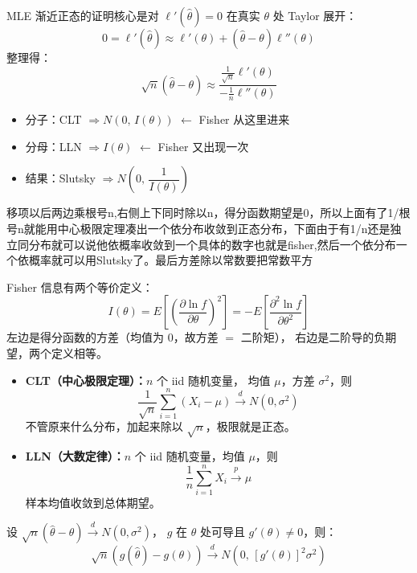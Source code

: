\begin{note}
    MLE 渐近正态的证明核心是对 $\ell'(\hat{\theta})=0$ 在真实 $\theta$ 处 Taylor 展开：
$$0 = \ell'(\hat{\theta}) \approx \ell'(\theta) + (\hat{\theta} - \theta)\ell''(\theta)$$
整理得：
$$\sqrt{n}(\hat{\theta} - \theta) \approx \frac{\frac{1}{\sqrt{n}}\ell'(\theta)}{-\frac{1}{n}\ell''(\theta)}$$

\begin{itemize}
  \item 分子：CLT $\Rightarrow N(0,\, I(\theta))$ \quad $\leftarrow$ Fisher 从这里进来
  \item 分母：LLN $\Rightarrow I(\theta)$ \quad $\leftarrow$ Fisher 又出现一次
  \item 结果：Slutsky $\Rightarrow N\!\left(0,\, \dfrac{1}{I(\theta)}\right)$
\end{itemize}


\end{note}
\begin{dxtips}
    移项以后两边乘根号n,右侧上下同时除以n，得分函数期望是0，所以上面有了1/根号n就能用中心极限定理凑出一个依分布收敛到正态分布，下面由于有1/n还是独立同分布就可以说他依概率收敛到一个具体的数字也就是fisher,然后一个依分布一个依概率就可以用Slutsky了。最后方差除以常数要把常数平方
    
\end{dxtips}
\begin{dxtips}
    Fisher 信息有两个等价定义：
$$I(\theta) = E\!\left[\left(\frac{\partial \ln f}{\partial\theta}\right)^2\right] = -E\!\left[\frac{\partial^2 \ln f}{\partial\theta^2}\right]$$
左边是得分函数的方差（均值为 $0$，故方差 $=$ 二阶矩），
右边是二阶导的负期望，两个定义相等。
\end{dxtips}
\begin{note}
    \begin{itemize}
  \item \textbf{CLT（中心极限定理）：}$n$ 个 iid 随机变量，
        均值 $\mu$，方差 $\sigma^2$，则
        $$\frac{1}{\sqrt{n}}\sum_{i=1}^n (X_i - \mu) \xrightarrow{d} N(0,\sigma^2)$$
        不管原来什么分布，加起来除以 $\sqrt{n}$，极限就是正态。

  \item \textbf{LLN（大数定律）：}$n$ 个 iid 随机变量，均值 $\mu$，则
        $$\frac{1}{n}\sum_{i=1}^n X_i \xrightarrow{p} \mu$$
        样本均值收敛到总体期望。
\end{itemize}
\end{note}
\begin{theorem}[Delta 方法]
设 $\sqrt{n}(\hat{\theta} - \theta) \xrightarrow{d} N(0, \sigma^2)$，
$g$ 在 $\theta$ 处可导且 $g'(\theta) \neq 0$，则：
$$\sqrt{n}(g(\hat{\theta}) - g(\theta)) \xrightarrow{d} N(0,\, [g'(\theta)]^2 \sigma^2)$$
\end{theorem}
